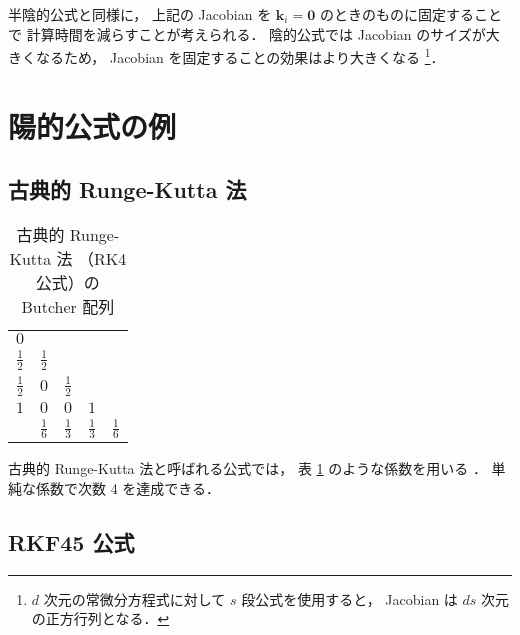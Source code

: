 半陰的公式と同様に，
上記の Jacobian を $\bm{k}_i = \bm{0}$ のときのものに固定することで
計算時間を減らすことが考えられる．
陰的公式では Jacobian のサイズが大きくなるため，
Jacobian を固定することの効果はより大きくなる
\footnote{$d$ 次元の常微分方程式に対して $s$ 段公式を使用すると，%
    Jacobian は $ds$ 次元の正方行列となる．}．

\section{陽的公式の例}

\subsection{古典的 Runge-Kutta 法}

\begin{table}[bp]
    \caption{古典的 Runge-Kutta 法 （RK4 公式）の Butcher 配列}
    \label{table:ode_runge-kutta_butcher-array-rk4}
    \centering
    \begin{tabular}{c|cccc}
        $0$           &               &               &               &               \\
        $\frac{1}{2}$ & $\frac{1}{2}$ &               &               &               \\
        $\frac{1}{2}$ & $0$           & $\frac{1}{2}$ &               &               \\
        $1$           & $0$           & $0$           & $1$           &               \\
        \hline
                      & $\frac{1}{6}$ & $\frac{1}{3}$ & $\frac{1}{3}$ & $\frac{1}{6}$
    \end{tabular}
\end{table}

古典的 Runge-Kutta 法と呼ばれる公式では，
表 \ref{table:ode_runge-kutta_butcher-array-rk4} のような係数を用いる
\cite[3.3 節]{Mitsui1993}．
単純な係数で次数 4 を達成できる．

\subsection{RKF45 公式}

